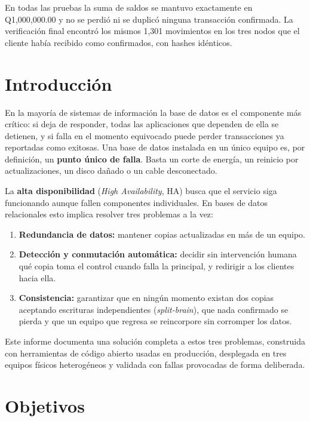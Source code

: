 \documentclass[11pt,a4paper]{article}
\begin{document}
En todas las pruebas la suma de saldos se mantuvo exactamente en Q1,000,000.00 y no se perdió ni se duplicó ninguna transacción confirmada. La verificación final encontró los mismos 1,301 movimientos en los tres nodos que el cliente había recibido como confirmados, con hashes idénticos.

\clearpage
\tableofcontents
\listoffigures
\listoftables
\clearpage

\section{Introducción}

En la mayoría de sistemas de información la base de datos es el componente más crítico: si deja de responder, todas las aplicaciones que dependen de ella se detienen, y si falla en el momento equivocado puede perder transacciones ya reportadas como exitosas. Una base de datos instalada en un único equipo es, por definición, un \textbf{punto único de falla}. Basta un corte de energía, un reinicio por actualizaciones, un disco dañado o un cable desconectado.

La \textbf{alta disponibilidad} (\emph{High Availability}, HA) busca que el servicio siga funcionando aunque fallen componentes individuales. En bases de datos relacionales esto implica resolver tres problemas a la vez:

\begin{enumerate}
  \item \textbf{Redundancia de datos:} mantener copias actualizadas en más de un equipo.
  \item \textbf{Detección y conmutación automática:} decidir sin intervención humana qué copia toma el control cuando falla la principal, y redirigir a los clientes hacia ella.
  \item \textbf{Consistencia:} garantizar que en ningún momento existan dos copias aceptando escrituras independientes (\emph{split-brain}), que nada confirmado se pierda y que un equipo que regresa se reincorpore sin corromper los datos.
\end{enumerate}

Este informe documenta una solución completa a estos tres problemas, construida con herramientas de código abierto usadas en producción, desplegada en tres equipos físicos heterogéneos y validada con fallas provocadas de forma deliberada.

\section{Objetivos}
\end{document}
